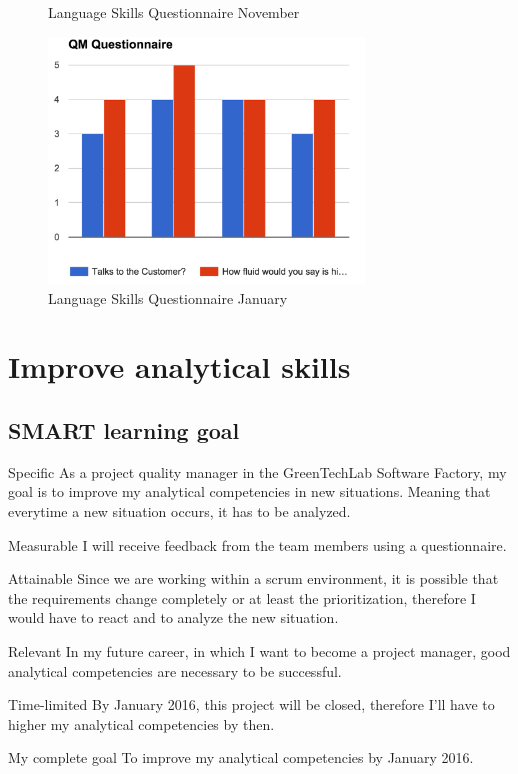 \documentclass[12pt]{article}
\begin{document}
\begin{STARR}
\begin{figure}
	    		\caption{Language Skills Questionnaire November}\label{lsqn}
	    	\end{figure}
	    	\begin{figure}
	    		\centering
	    		\includegraphics[width=0.75\textwidth, keepaspectratio=true]{qmquest2.png}
	    		\caption{Language Skills Questionnaire January}\label{lsqj}
	    	\end{figure}
	\end{STARR}
	\newpage
	\section{Improve analytical skills}
	\subsection{SMART learning goal}
	\begin{SMART}
	    \item[Specific] As a project quality manager in the GreenTechLab Software Factory, my goal is to improve my analytical competencies in new situations. Meaning that everytime a new situation occurs, it has to be analyzed.
	    \item[Measurable] I will receive feedback from the team members using a questionnaire.
	    \item[Attainable] Since we are working within a scrum environment, it is possible that the requirements change completely or at least the prioritization, therefore I would have to react and to analyze the new situation.
	    \item[Relevant] In my future career, in which I want to become a project manager, good analytical competencies are necessary to be successful.
	    \item[Time-limited] By January 2016, this project will be closed, therefore I’ll have to higher my analytical competencies by then.
	    \item[My complete goal] To improve my analytical competencies by January 2016.
	\end{SMART}
	
\end{document}
